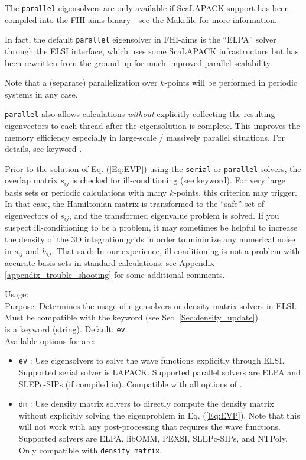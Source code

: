 The \texttt{parallel} eigensolvers are only available if ScaLAPACK support has
been compiled into the FHI-aims binary---see the Makefile for more information.

In fact, the default \texttt{parallel} eigensolver in FHI-aims is the ``ELPA''
solver through the ELSI interface, which uses some ScaLAPACK infrastructure but
has been rewritten from the ground up for much improved parallel scalability.

Note that a (separate) parallelization over $k$-points will be performed in
periodic systems in any case.

 \texttt{parallel} also allows calculations \emph{without}
explicitly collecting the resulting eigenvectors to each thread after the
eigensolution is complete. This improves the memory efficiency especially in
large-scale / massively parallel situations. For details, see keyword
.

Prior to the solution of Eq. (\ref{Eq:EVP}) using the \texttt{serial} or
\texttt{parallel} solvers, the overlap matrix $s_{ij}$ is checked for
ill-conditioning (see  keyword). For very large basis
sets or periodic calculations with many $k$-points, this criterion may trigger.
In that case, the Hamiltonian matrix is transformed to the ``safe'' set of
eigenvectors of $s_{ij}$, and the transformed eigenvalue problem is solved. If
you suspect ill-conditioning to be a problem, it may sometimes be helpful to
increase the density of the 3D integration grids in order to minimize any
numerical noise in $s_{ij}$ and $h_{ij}$. That said: In our experience,
ill-conditioning is not a problem with accurate basis sets in standard
calculations; see Appendix \ref{appendix_trouble_shooting} for some additional
comments.

{
  \noindent
  Usage:   \\[1.0ex]
  Purpose: Determines the usage of eigensolvers or density matrix solvers in
    ELSI. Must be compatible with the  keyword
    (see Sec. \ref{Sec:density_update}). \\[1.0ex]
   is a keyword (string). Default: \texttt{ev}. \\
}
Available options for  are:
\begin{itemize}
  \item \texttt{ev} : Use eigensolvers to solve the wave functions explicitly
    through ELSI. Supported serial solver is LAPACK. Supported parallel solvers
    are ELPA and SLEPc-SIPs (if compiled in). Compatible with all options of
    .
  \item \texttt{dm} : Use density matrix solvers to directly compute the density
    matrix without explicitly solving the eigenproblem in Eq. (\ref{Eq:EVP}).
    Note that this will not work with any post-processing that requires the wave
    functions. Supported solvers are ELPA, libOMM, PEXSI, SLEPc-SIPs, and
    NTPoly. Only compatible with 
    \texttt{density\_matrix}.
\end{itemize}

